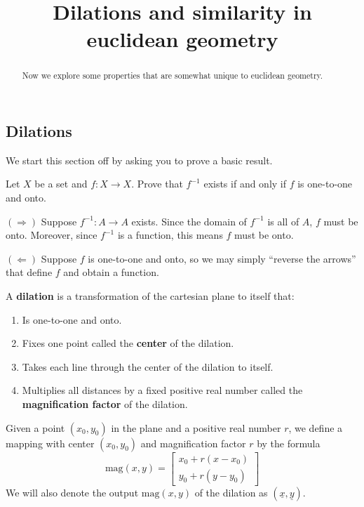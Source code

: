 \documentclass[newpage,hints,handout,12pt,noauthor,nooutcomes]{ximera}
\title{Dilations and similarity in euclidean geometry}
\begin{document}
\begin{abstract}
Now we explore some properties that are somewhat unique to euclidean
geometry.
\end{abstract}
\maketitle

\subsection{Dilations}

We start this section off by asking you to prove a basic result.

\begin{problem}
  Let $X$ be a set and $f: X \to X$. Prove that $f^{-1}$ exists if and
  only if $f$ is one-to-one and onto.
  \begin{freeResponse}
    $(\Rightarrow)$ Suppose $f^{-1}:A\to A$ exists. Since the domain
    of $f^{-1}$ is all of $A$, $f$ must be onto. Moreover, since
    $f^{-1}$ is a function, this means $f$ must be onto. 
    
    $(\Leftarrow)$ Suppose $f$ is one-to-one and onto, so we may simply
    ``reverse the arrows'' that define $f$ and obtain a function.
  \end{freeResponse}
\end{problem}


\begin{definition}
A \textbf{dilation} is a transformation of the cartesian plane to
itself that:
\begin{enumerate}
\item Is one-to-one and onto.
\item Fixes one point called the \textbf{center} of the dilation.
\item Takes each line through the center of the dilation to itself.
\item Multiplies all distances by a fixed positive real number called
  the \textbf{magnification factor} of the dilation.
\end{enumerate}
\end{definition}

\begin{definition}
Given a point $\left(x_{0},y_{0}\right)$ in the plane and a positive
real number $r$, we define a mapping with center $\left(
x_{0},y_{0}\right)$ and magnification factor $r$ by the formula
\[
\mathrm{mag}(x,y)  =
\begin{bmatrix}
  x_0 + r(x-x_0)\\
  y_0 + r(y-y_0)
  \end{bmatrix}
\]
We will also denote the output $\mathrm{mag}(x,y)$ of the dilation
as $\left(\underline{x},\underline{y}\right)$.
\end{definition}
\end{document}
